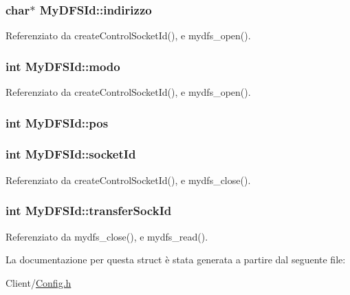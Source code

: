 \subsubsection[{indirizzo}]{\setlength{\rightskip}{0pt plus 5cm}char$\ast$ My\+D\+F\+S\+Id\+::indirizzo}\label{structMyDFSId_ac8c10a1a5b18776bf5e5585ee9e26331}


Referenziato da create\+Control\+Socket\+Id(), e mydfs\+\_\+open().

\hypertarget{structMyDFSId_a98bc5ce1a7734459d8b81c997da4e9f0}{}
\subsubsection[{modo}]{\setlength{\rightskip}{0pt plus 5cm}int My\+D\+F\+S\+Id\+::modo}\label{structMyDFSId_a98bc5ce1a7734459d8b81c997da4e9f0}


Referenziato da create\+Control\+Socket\+Id(), e mydfs\+\_\+open().

\hypertarget{structMyDFSId_aaeac229fb85c313f91a76f00be916832}{}
\subsubsection[{pos}]{\setlength{\rightskip}{0pt plus 5cm}int My\+D\+F\+S\+Id\+::pos}\label{structMyDFSId_aaeac229fb85c313f91a76f00be916832}
\hypertarget{structMyDFSId_a382a74f109962751085cea7aac2892cc}{}
\subsubsection[{socket\+Id}]{\setlength{\rightskip}{0pt plus 5cm}int My\+D\+F\+S\+Id\+::socket\+Id}\label{structMyDFSId_a382a74f109962751085cea7aac2892cc}


Referenziato da create\+Control\+Socket\+Id(), e mydfs\+\_\+close().

\hypertarget{structMyDFSId_a3b62a6d0f52a871bda4bf9cd56c57ff7}{}
\subsubsection[{transfer\+Sock\+Id}]{\setlength{\rightskip}{0pt plus 5cm}int My\+D\+F\+S\+Id\+::transfer\+Sock\+Id}\label{structMyDFSId_a3b62a6d0f52a871bda4bf9cd56c57ff7}


Referenziato da mydfs\+\_\+close(), e mydfs\+\_\+read().



La documentazione per questa struct è stata generata a partire dal seguente file\+:\begin{DoxyCompactItemize}
\item 
Client/\hyperlink{Client_2Config_8h}{Config.\+h}\end{DoxyCompactItemize}
